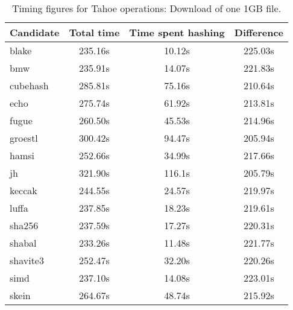 \begin{table}[h]
  \centering
  \begin{tabular}{ | l | c | c | c | }
    \hline
    Candidate & Total time & Time spent hashing & Difference \\ \hline
    blake & 235.16s & 10.12s & 225.03s \\ \hline
    bmw & 235.91s & 14.07s & 221.83s \\ \hline
    cubehash & 285.81s & 75.16s & 210.64s \\ \hline
    echo & 275.74s & 61.92s & 213.81s \\ \hline
    fugue & 260.50s & 45.53s & 214.96s \\ \hline
    groestl & 300.42s & 94.47s & 205.94s \\ \hline
    hamsi & 252.66s & 34.99s & 217.66s \\ \hline
    jh & 321.90s & 116.1s & 205.79s \\ \hline
    keccak & 244.55s & 24.57s & 219.97s \\ \hline
    luffa & 237.85s & 18.23s & 219.61s \\ \hline
    sha256 & 237.59s & 17.27s & 220.31s \\ \hline
    shabal & 233.26s & 11.48s & 221.77s \\ \hline
    shavite3 & 252.47s & 32.20s & 220.26s \\ \hline
    simd & 237.10s & 14.08s & 223.01s \\ \hline
    skein & 264.67s & 48.74s & 215.92s \\ \hline
  \end{tabular}
  \caption{Timing figures for Tahoe operations: Download of one 1GB file.}
  \label{tbl:hashingtimes:get1gb}
\end{table}
